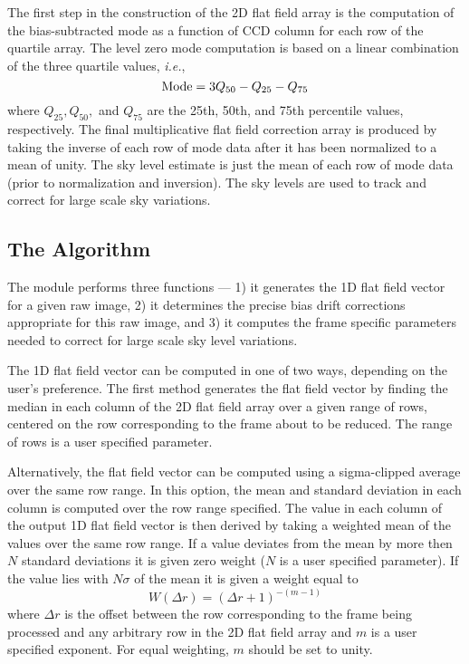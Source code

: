 The first step in the construction of the 2D flat field array 
is the computation of  the bias-subtracted 
mode as a function of CCD column for each row of the quartile array. 
The level zero mode computation is based on a linear combination
of the three quartile values, {\it i.e.},
$$\hbox{Mode} = 3Q_{50} - Q_{25} - Q_{75} $$
where $Q_{25}, Q_{50},$ and $Q_{75}$ are the 25th, 50th, and 75th percentile
values, respectively. The final multiplicative flat field correction array
is produced by taking the inverse of each row of mode data after
it has been normalized to a mean of unity.
The sky level estimate is just the mean of each row of mode data
(prior to normalization and inversion). The sky levels are used
to track and correct for large scale sky variations.

\subsection{The \iff Algorithm}

The \iff module performs three functions --- 1) it generates the
1D flat field vector for a given raw image, 2) it determines the
precise bias drift corrections appropriate for this raw image,
and 3) it computes the frame specific parameters needed to correct
for large scale sky level variations.
 
The 1D flat field vector can be computed in one of two ways, depending
on the user's preference. The first method generates the flat field vector
by finding the median in each column of the 2D flat field array 
over a given range of rows, centered on the row corresponding to the frame
about to be reduced. The range of rows is a user specified parameter.

Alternatively, the flat field vector can be computed using a sigma-clipped
average over the same row range. In this option, the mean and standard
deviation in each column is computed over the row range specified.
The value in each column of the output 1D flat field vector is then
derived by taking a weighted mean of the values over the same row range.
If a value deviates from the mean by more then $N$ standard deviations
it is given zero weight ($N$ is a user specified parameter). If the
value lies with $N\sigma$ of the mean it is given a weight equal to 
$$ W(\Delta r) = (\Delta r + 1)^{-(m-1)} $$
where $\Delta r$ is the offset between the row corresponding
to the frame being processed and any arbitrary row in the 2D flat field
array and $m$ is a user specified exponent. For equal weighting, $m$ should
be set to unity. 

